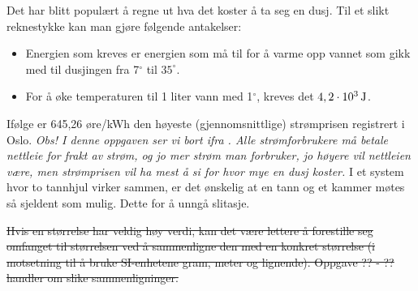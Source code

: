 \newpage
{}
Det har blitt populært å regne ut hva det koster å ta seg en dusj. Til et slikt reknestykke kan man gjøre følgende antakelser:
\begin{itemize}
	\item Energien som kreves er energien som må til for å varme opp vannet som gikk med til dusjingen fra 7$^\circ $ til $ 35^\circ $.
	\item For å øke temperaturen til 1 liter vann med 1$ ^\circ $, kreves det $ 4,2\cdot10^3\,\textrm{J} $.
\end{itemize}
Ifølge  er 645,26 øre/kWh den høyeste (gjennomsnittlige) strømprisen registrert i Oslo. 
\textit{\small Obs! I denne oppgaven ser vi bort ifra . Alle strømforbrukere må betale nettleie for frakt av strøm, og jo mer strøm man forbruker, jo høyere vil nettleien være, men strømprisen vil ha mest å si for hvor mye en dusj koster.}
\newpage
{}
I et system hvor to tannhjul virker sammen, er det ønskelig at en tann og et kammer møtes så sjeldent som mulig. Dette for å unngå slitasje. \vsk

\newpage
\st{
Hvis en størrelse har veldig høy verdi, kan det være lettere å forestille seg omfanget til størrelsen ved å sammenligne den med en konkret størrelse (i motsetning til å bruke SI-enhetene gram, meter og lignende). Oppgave ?? - ?? handler om slike sammenligninger.}

